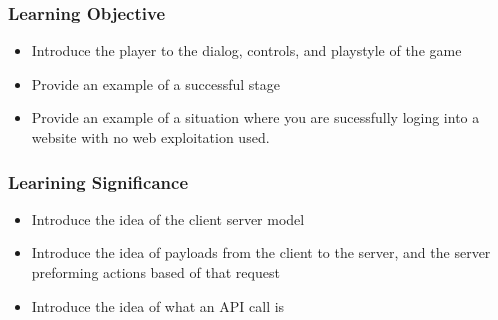 \documentclass{article}
\begin{document}
\subsubsection{Learning Objective}

\begin{itemize}

  \item Introduce the player to the dialog, controls, and playstyle of
the game
  \item Provide an example of a successful stage
  \item Provide an example of a situation where you are sucessfully
loging into a website with no web exploitation used.
\end{itemize}

\subsubsection{Learining Significance}

\begin{itemize}
  \item Introduce the idea of the client server model
  \item Introduce the idea of payloads from the client to the server,
    and the server preforming actions based of that request
  \item Introduce the idea of what an API call is
\end{itemize}
    
\end{document}
